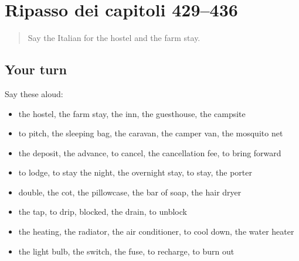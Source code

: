 \section[(dialogue)]{Ripasso dei capitoli 429–436}

\label{lesson:IT-R436-ripasso-429-436}



\begin{quote}
Say the Italian for the hostel and the farm stay.
\end{quote}

\subsection*{Your turn}
Say these aloud:

\begin{itemize}
\raggedright
  \item the hostel, the farm stay, the inn, the guesthouse, the campsite
  \item to pitch, the sleeping bag, the caravan, the camper van, the mosquito net
  \item the deposit, the advance, to cancel, the cancellation fee, to bring forward
  \item to lodge, to stay the night, the overnight stay, to stay, the porter
  \item double, the cot, the pillowcase, the bar of soap, the hair dryer
  \item the tap, to drip, blocked, the drain, to unblock
  \item the heating, the radiator, the air conditioner, to cool down, the water heater
  \item the light bulb, the switch, the fuse, to recharge, to burn out
\end{itemize}

